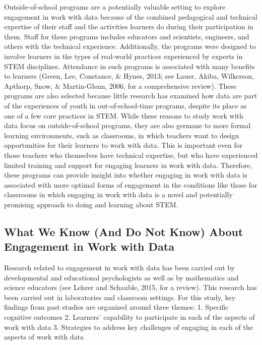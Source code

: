\documentclass[]{msu-thesis}
\theoremstyle{definition}
\theoremstyle{definition}
\theoremstyle{definition}
\theoremstyle{remark}
\begin{document}
Outside-of-school programs are a potentially valuable setting to explore
engagement in work with data because of the combined pedagogical and
technical expertise of their staff and the activities learners do during
their participation in them. Staff for these programs includes educators
and scientists, engineers, and others with the technical experience.
Additionally, the programs were designed to involve learners in the
types of real-world practices experienced by experts in STEM
disciplines. Attendance in such programs is associated with many
benefits to learners (Green, Lee, Constance, \& Hynes, 2013; see Lauer,
Akiba, Wilkerson, Apthorp, Snow, \& Martin-Glenn, 2006, for a
comprehensive review). These programs are also selected because little
research has examined how data are part of the experiences of youth in
out-of-school-time programs, despite its place as one of a few core
practices in STEM. While these reasons to study work with data focus on
outside-of-school programs, they are also germane to more formal
learning environments, such as classrooms, in which teachers want to
design opportunities for their learners to work with data. This is
important even for those teachers who themselves have technical
expertise, but who have experienced limited training and support for
engaging learners in work with data. Therefore, these programs can
provide insight into whether engaging in work with data is associated
with more optimal forms of engagement in the conditions like those for
classrooms in which engaging in work with data is a novel and
potentially promising approach to doing and learning about STEM.

\subsection{What We Know (And Do Not Know) About Engagement in Work with
Data}\label{what-we-know-and-do-not-know-about-engagement-in-work-with-data}

Research related to engagement in work with data has been carried out by
developmental and educational psychologists as well as by mathematics
and science educators (see Lehrer and Schauble, 2015, for a review).
This research has been carried out in laboratories and classroom
settings. For this study, key findings from past studies are organized
around three themes: 1. Specific cognitive outcomes 2. Learners'
capability to participate in each of the aspects of work with data 3.
Strategies to address key challenges of engaging in each of the aspects
of work with data
\end{document}
